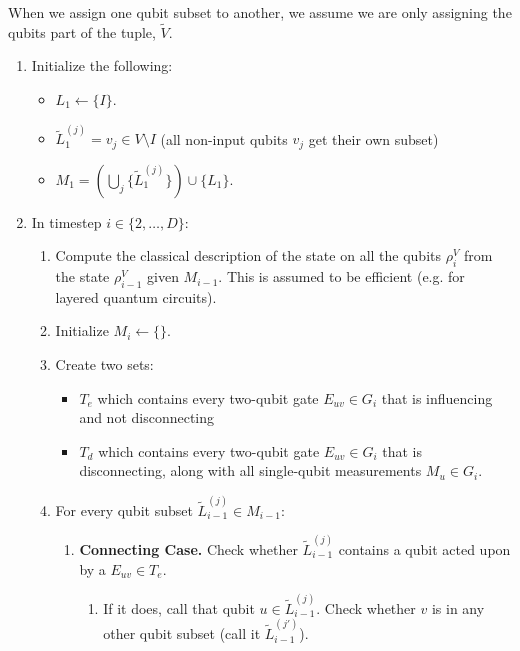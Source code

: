 When we assign one qubit subset to another, we assume we are only assigning
the qubits part of the tuple, $\tilde{V}$.

\begin{enumerate}
\item
Initialize the following:
\begin{itemize}
\item
$L_1 \leftarrow \{ I \}$.
\item
$\tilde{L}^{(j)}_1 = v_j \in V \setminus I$ (all non-input qubits $v_j$ get their own subset)
\item
$M_1 = \left( \bigcup_j \{ \tilde{L}^{(j)}_1 \} \right) \cup \{ L_1 \} $.
\end{itemize}

\item
In timestep $i \in \{2, \ldots, D \}$:

\begin{enumerate}

\item
Compute the classical description of the state on all the qubits $\rho^{V}_i$
from the state $\rho^{V}_{i-1}$
given $M_{i-1}$.
This is assumed to be efficient (e.g. for layered quantum circuits). 
\item
Initialize $M_i \leftarrow \{\}$.
\item
Create two sets:
\begin{itemize}
\item $T_e$ which contains every two-qubit
gate $E_{uv} \in G_i$ that is influencing and not disconnecting
\item $T_d$ which contains every two-qubit
gate $E_{uv} \in G_i$ that is disconnecting,
along with all single-qubit measurements $M_u \in G_i$.
\end{itemize}

\item
For every qubit subset $\tilde{L}^{(j)}_{i-1} \in M_{i-1}$:

\begin{enumerate}
\item \textbf{Connecting Case.} Check whether $\tilde{L}^{(j)}_{i-1}$ contains a qubit acted upon by a
$E_{uv} \in T_e$.

\begin{enumerate}
\item If it does, call that qubit
$u \in \tilde{L}^{(j)}_{i-1}$.
Check whether $v$ is in any other qubit subset
(call it $\tilde{L}^{(j')}_{i-1}$).


\end{enumerate}
\end{enumerate}
\end{enumerate}
\end{enumerate}

